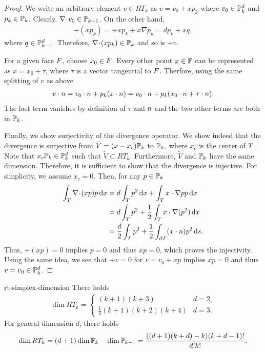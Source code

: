 \begin{proof}
  We write an arbitrary element $v\in RT_k$ as $v=v_0+x p_k$ where
  $v_0\in \P_k^d$ and $p_k\in \P_k$. Clearly, $\div v_0 \in
  \P_{k-1}$. On the other hand,
  \begin{gather*}
    \div (xp_k) = \div x p_k + x\nabla p_k = d p_k + x q,
  \end{gather*}
  where $q\in \P_{k-1}^d$. Therefore, $\div(xp_k) \in \P_k$ and so is
  $\div v$.

  For a given face $\face$, choose $x_0\in\face$. Every other point
  $x\in \F$ can be represented as $x=x_0+ \tau$, where $\tau$ is a
  vector tangential to $\face$. Therfore, using the same splitting of
  $v$ as above
  \begin{gather*}
    v\cdot\n = v_0\cdot\n + p_k (x\cdot\n)
    = v_0\cdot\n + p_k (x_0\cdot\n + \tau\cdot\n).
  \end{gather*}
  The last term vanishes by definition of $\tau$ and $\n$ and the two
  other terms are both in $\P_k$.

  Finally, we show surjectivity of the divergence operator. We show
  indeed that the divergence is surjective from
  $\tilde V = (x-x_c)\P_k$ to $\P_k$, where $x_c$ is the center of
  $\cell$. Note that $x_c\P_k\in \P_k^d$ such that
  $\tilde V\subset RT_k$. Furthermore, $\tilde V$ and $\P_k$ have the
  same dimension. Therefore, it is sufficient to show that the
  divergence is injective. For simplicity, we assume $x_c=0$. Then,
  for any $p\in \P_k$
  \begin{align*}
    \int_\cell \div (xp)p \dx
    &= d \int_\cell p^2\dx + \int_\cell x \cdot\nabla p p\dx
    \\
    &= d \int_\cell p^2 + \frac12 \int_\cell x \cdot\nabla(p^2)\dx
    \\
    &= \frac d2 \int_\cell p^2 + \frac12 \int_{\d\cell} (x\cdot\n) p^2\ds.
  \end{align*}
  Thus, $\div(xp) = 0$ implies $p=0$ and thus $xp=0$, which proves the
  injectivity. Using the same idea, we see that $\div v=0$ for
  $v=v_0+xp$ implies $xp=0$ and thus $v=v_0\in\P_k^d$.
\end{proof}

\begin{Lemma}{rt-simplex-dimension}
  There holds
  \begin{gather}
    \label{eq:darcy:23}
    \dim RT_k =
    \begin{cases}
      (k+1)(k+3) & d=2,
      \\
      \tfrac12 (k+1)(k+2)(k+4) & d=3.
    \end{cases}
  \end{gather}
  For general dimension $d$, there holds
  \begin{gather}
    \dim RT_k = (d+1)\dim\P_k - \dim \P_{k-1}
    = \frac{((d+1)(k+d)-k)(k+d-1)!}{d!k!}.
  \end{gather}
\end{Lemma}

